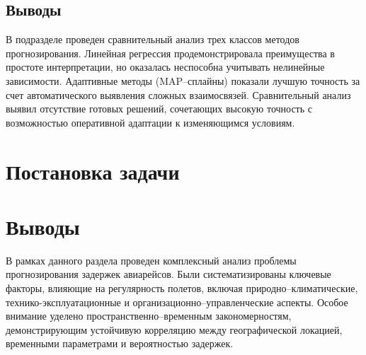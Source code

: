 \subsection*{Выводы}

В подразделе проведен сравнительный анализ трех классов методов прогнозирования.
Линейная регрессия продемонстрировала преимущества в простоте интерпретации, но оказалась неспособна учитывать нелинейные зависимости.
Адаптивные методы (MAP--сплайны) показали лучшую точность за счет автоматического выявления сложных взаимосвязей.
Сравнительный анализ выявил отсутствие готовых решений, сочетающих высокую точность с возможностью оперативной адаптации к изменяющимся условиям.

%

\section{Постановка задачи}


\section*{Выводы}
В рамках данного раздела проведен комплексный анализ проблемы прогнозирования задержек авиарейсов.
Были систематизированы ключевые факторы, влияющие на регулярность полетов, включая природно--климатические, технико-эксплуатационные и организационно--управленческие аспекты.
Особое внимание уделено пространственно--временным закономерностям, демонстрирующим устойчивую корреляцию между географической локацией, временными параметрами и вероятностью задержек.

